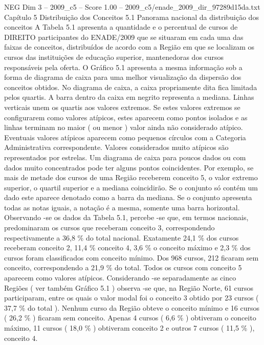 \begin{textsample}{NEG Dim 3 – 2009\_c5 – Score 1.00 – 2009\_c5/enade\_2009\_dir\_97289d15da.txt}  \label{ex:f3_neg_110}
Capítulo 5 Distribuição dos Conceitos 5.1 Panorama nacional da distribuição dos conceitos A Tabela 5.1 apresenta a quantidade e o percentual de cursos de DIREITO participantes do ENADE/2009 que se situaram em cada uma das faixas de conceitos, distribuídos de acordo com a Região em que se localizam os cursos das instituições de educação superior, mantenedoras dos cursos responsáveis pela oferta.
O Gráfico 5.1 apresenta a mesma informação sob a forma de diagrama de caixa para uma melhor visualização da dispersão dos conceitos obtidos.
No diagrama de caixa, a caixa propriamente dita fica limitada pelos quartis.
A barra dentro da caixa em negrito representa a mediana.
Linhas verticais unem os quartis aos valores extremos.
Se estes valores extremos se configurarem como valores atípicos, estes aparecem como pontos isolados e as linhas terminam no maior ( ou menor ) valor ainda não considerado atípico.
Eventuais valores atípicos aparecem como pequenos círculos com a Categoria Administrativa correspondente.
Valores considerados muito atípicos são representados por estrelas.
Um diagrama de caixa para poucos dados ou com dados muito concentrados pode ter alguns pontos coincidentes.
Por exemplo, se mais de metade dos cursos de uma Região receberem conceito 5, o valor extremo superior, o quartil superior e a mediana coincidirão.
Se o conjunto só contém um dado este aparece denotado como a barra da mediana.
Se o conjunto apresenta todas as notas iguais, a notação é a mesma, somente uma barra horizontal.
Observando -se os dados da Tabela 5.1, percebe -se que, em termos nacionais, predominaram os cursos que receberam conceito 3, correspondendo respectivamente a 36,8 \% do total nacional.
Exatamente 24,1 \% dos cursos receberam conceito 2, 11,4 \% conceito 4, 3,6 \% o conceito máximo e 2,3 \% dos cursos foram classificados com conceito mínimo.
Dos 968 cursos, 212 ficaram sem conceito, correspondendo a 21,9 \% do total.
Todos os cursos com conceito 5 aparecem como valores atípicos.
Considerando -se separadamente as cinco Regiões ( ver também Gráfico 5.1 ) observa -se que, na Região Norte, 61 cursos participaram, entre os quais o valor modal foi o conceito 3 obtido por 23 cursos ( 37,7 \% do total ).
Nenhum curso da Região obteve o conceito mínimo e 16 cursos ( 26,2 \% ) ficaram sem conceito.
Apenas 4 cursos ( 6,6 \% ) obtiveram o conceito máximo, 11 cursos ( 18,0 \% ) obtiveram conceito 2 e outros 7 cursos ( 11,5 \% ), conceito 4.

\end{textsample}
